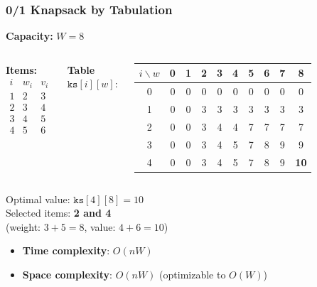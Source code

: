 \documentclass{beamer}
\begin{document}
\begin{frame}
    \frametitle{0/1 Knapsack by Tabulation}

    \textbf{Capacity:} $W = 8$\\[0.5em]

    \begin{columns}[T]
        \textbf{Items:}
        \[
        \begin{array}{c|c|c}
            i & w_i & v_i \\
            \hline
            1 & 2 & 3 \\
            2 & 3 & 4 \\
            3 & 4 & 5 \\
            4 & 5 & 6 \\
        \end{array}
        \]

        \textbf{Table} $\texttt{ks}[i][w]$:
        \small
        \begin{tabular}{c|ccccccccc}
            $i\backslash w$ & 0&1&2&3&4&5&6&7&8 \\
            \hline
            0 & 0&0&0&0&0&0&0&0&0 \\
            1 & 0&0&3&3&3&3&3&3&3 \\
            2 & 0&0&3&4&4&7&7&7&7 \\
            3 & 0&0&3&4&5&7&8&9&9 \\
            4 & 0&0&3&4&5&7&8&9&\textbf{10} \\
        \end{tabular}
    \end{columns}

    \vspace{1em}
    Optimal value: $\texttt{ks}[4][8] = 10$ \\
    Selected items: \textbf{2 and 4} \quad \\ (weight: $3+5=8$, value: $4+6=10$)
    \bigskip
    \footnotesize
    \begin{itemize}
        \item \textbf{Time complexity}: $O(nW)$
        \item \textbf{Space complexity}: $O(nW)$ (optimizable to $O(W)$)
    \end{itemize}
\end{frame}
\end{document}
